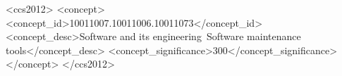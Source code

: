 \documentclass[acmsmall,screen,review,anonymous]{acmart}
\begin{document}
\begin{CCSXML}
<ccs2012>
   <concept>
       <concept_id>10011007.10011006.10011073</concept_id>
       <concept_desc>Software and its engineering~Software maintenance tools</concept_desc>
       <concept_significance>300</concept_significance>
   </concept>
</ccs2012>
\end{CCSXML}








\maketitle





% 


\end{document}
